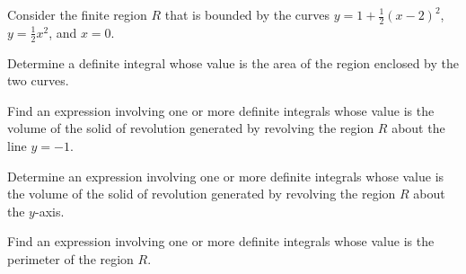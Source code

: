 \begin{exercises}
    
   \item  Consider the finite region $R$ that is bounded by the curves $y = 1+\frac{1}{2}(x-2)^2$, $y=\frac{1}{2}x^2$, and $x = 0$.
         \ba
		\item Determine a definite integral whose value is the area of the region enclosed by the two curves.  
    		\item Find an expression involving one or more definite integrals whose value is the volume of the solid of revolution generated by revolving the region $R$ about the line $y = -1$. 
		\item Determine an expression involving one or more definite integrals whose value is the volume of the solid of revolution generated by revolving the region $R$ about the $y$-axis.  
		\item Find an expression involving one or more definite integrals whose value is the perimeter of the region $R$.
         \ea
   
\end{exercises}
\afterexercises

